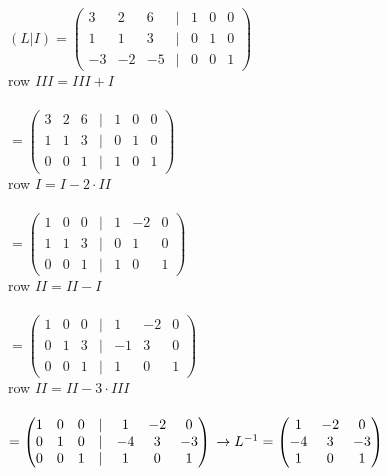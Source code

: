 \noindent$
(L | I ) =
\begin{pmatrix}
3 & 2 & 6 & | & 1 & 0 & 0 \\
1 & 1 & 3 & | & 0 & 1 & 0 \\
-3 & -2 & -5 & | & 0 & 0 & 1
\end{pmatrix}$\\
row $III = III + I$\\\\
$=
\begin{pmatrix}
3 & 2 & 6 & | & 1 & 0 & 0 \\
1 & 1 & 3 & | & 0 & 1 & 0 \\
0 & 0 & 1 & | & 1 & 0 & 1
\end{pmatrix}$\\
row $I = I - 2 \cdot II$\\\\
$=
\begin{pmatrix}
1 & 0 & 0 & | & 1 & -2 & 0 \\
1 & 1 & 3 & | & 0 & 1 & 0 \\
0 & 0 & 1 & | & 1 & 0 & 1
\end{pmatrix}$\\
row $II = II - I$\\\\
$=
\begin{pmatrix}
1 & 0 & 0 & | & 1 & -2 & 0 \\
0 & 1 & 3 & | & -1 & 3 & 0 \\
0 & 0 & 1 & | & 1 & 0 & 1
\end{pmatrix}$\\
row $II = II - 3 \cdot III$\\\\
$=
\begin{pmatrix}
1 & 0 & 0 & | & 1 & -2 & 0 \\
0 & 1 & 0 & | & -4 & 3 & -3 \\
0 & 0 & 1 & | & 1 & 0 & 1
\end{pmatrix}\\
\rightarrow L^{-1} =
\begin{pmatrix}
1 & -2 & 0 \\
-4 & 3 & -3 \\
1 & 0 & 1
\end{pmatrix}
$\\

